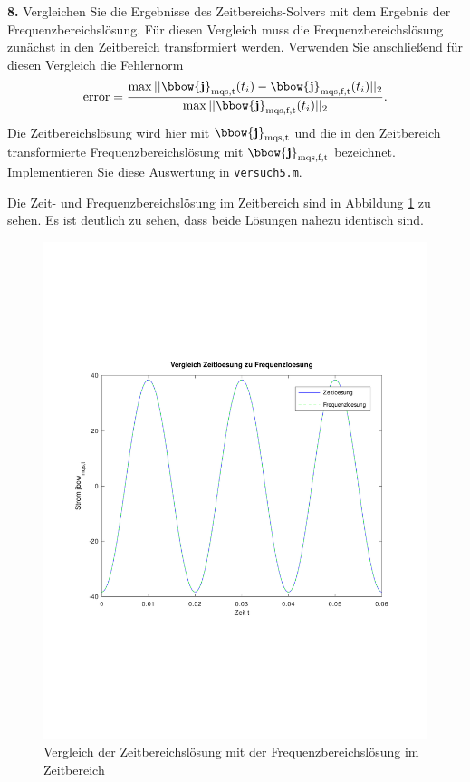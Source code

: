 \documentclass[Protokollheft.tex]{subfiles}
\begin{document}
\begin{framed}
	\noindent \textbf{8.} Vergleichen Sie die Ergebnisse des Zeitbereichs-Solvers mit dem Ergebnis der Frequenzbereichslösung. Für diesen Vergleich muss die Frequenzbereichslösung zunächst in den Zeitbereich transformiert werden. Verwenden Sie anschließend für diesen Vergleich die Fehlernorm
      \begin{equation}
          \text{error} = \frac{\max||\bbow{\mathbf{j}}_\text{mqs,t}(t_i)-\bbow{\mathbf{j}}_\text{mqs,f,t}(t_i)||_2}{\max||\bbow{\mathbf{j}}_\text{mqs,f,t}(t_i)||_2}.
          \label{eq:errorNorm}
      \end{equation}
Die Zeitbereichslösung wird hier mit $\bbow{\mathbf{j}}_\text{mqs,t}$ und die in den Zeitbereich transformierte Frequenzbereichslösung mit $\bbow{\mathbf{j}}_\text{mqs,f,t}$ bezeichnet. Implementieren Sie diese Auswertung in \lstinline{versuch5.m}.\label{exer:compareFreqVStimeInTime}
\end{framed}
\noindent
Die Zeit- und Frequenzbereichslösung im Zeitbereich sind in Abbildung \ref{fig:Zeit_Freq_Vergl} zu sehen. Es ist deutlich zu sehen, dass beide Lösungen nahezu identisch sind.
\begin{figure}[h]
	\centering
	\includegraphics[trim = 15mm 65mm 15mm 65mm, clip,width=0.7\linewidth]{Zeit_Freq_Vergl.pdf}
	\caption{Vergleich der Zeitbereichslösung mit der Frequenzbereichslösung im Zeitbereich}
	\label{fig:Zeit_Freq_Vergl}
\end{figure}
\end{document}
